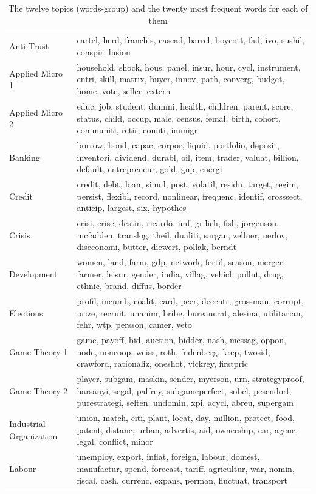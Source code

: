 \begin{table}[tb]
\caption[Topics]{The twelve topics (words-group) and the twenty most frequent words for each of them}
\label{tab:topics}
\begin{tabularx}{\hsize}{lY}
\toprule
\midrule
Anti-Trust & cartel, herd, franchis, cascad, barrel, boycott, fad, ivo, sushil, conspir, lusion \\
Applied Micro 1 & household, shock, hous, panel, insur, hour, cycl, instrument, entri, skill, matrix, buyer, innov, path, converg, budget, home, vote, seller, extern \\
Applied Micro 2 & educ, job, student, dummi, health, children, parent, score, status, child, occup, male, census, femal, birth, cohort, communiti, retir, counti, immigr \\
Banking & borrow, bond, capac, corpor, liquid, portfolio, deposit, inventori, dividend, durabl, oil, item, trader, valuat, billion, default, entrepreneur, gold, gnp, energi \\
Credit & credit, debt, loan, simul, post, volatil, residu, target, regim, persist, flexibl, record, nonlinear, frequenc, identif, crosssect, anticip, largest, six, hypothes \\
Crisis & crisi, crise, destin, ricardo, imf, grilich, fish, jorgenson, mcfadden, translog, theil, dualiti, sargan, zellner, nerlov, diseconomi, butter, diewert, pollak, berndt \\
Development & women, land, farm, gdp, network, fertil, season, merger, farmer, leisur, gender, india, villag, vehicl, pollut, drug, ethnic, brand, diffus, border \\
Elections & profil, incumb, coalit, card, peer, decentr, grossman, corrupt, prize, recruit, unanim, bribe, bureaucrat, alesina, utilitarian, fehr, wtp, persson, camer, veto \\
Game Theory 1 & game, payoff, bid, auction, bidder, nash, messag, oppon, node, noncoop, weiss, roth, fudenberg, krep, twosid, crawford, rationaliz, oneshot, vickrey, firstpric \\
Game Theory 2 & player, subgam, maskin, sender, myerson, urn, strategyproof, harsanyi, segal, palfrey, subgameperfect, sobel, pesendorf, purestrategi, selten, undomin, xpi, acycl, abreu, supergam \\
Industrial Organization & union, match, citi, plant, locat, day, million, protect, food, patent, distanc, urban, advertis, aid, ownership, car, agenc, legal, conflict, minor \\
Labour & unemploy, export, inflat, foreign, labour, domest, manufactur, spend, forecast, tariff, agricultur, war, nomin, fiscal, cash, currenc, expans, perman, fluctuat, transport \\

\end{tabularx}
\end{table}
